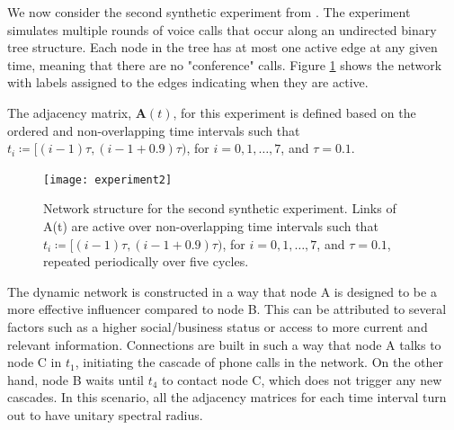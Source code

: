 

\newpage
{}


We now consider the second synthetic experiment from \cite{grindrod2014dynamical}. The experiment simulates multiple rounds of voice calls that occur along an undirected binary tree structure. Each node in the tree has at most one active edge at any given time, meaning that there are no "conference" calls.  Figure \ref{fig:exp2} shows the network with labels assigned to the edges indicating when they are active. 

The adjacency matrix, $\mathbf{A}(t)$, for this experiment is defined based on the ordered and non-overlapping time intervals such that $t_i\coloneqq[(i − 1)\tau , (i − 1 + 0.9)\tau )$, for $i=0, 1, \dots , 7$, and $\tau =0.1$.

\begin{figure}[h]\centering
    \texttt{[image: experiment2]}
    \caption{Network structure for the second synthetic experiment. Links of A(t)  are active over non-overlapping time intervals such that $t_i\coloneqq[(i − 1)\tau , (i − 1 + 0.9)\tau )$, for $i=0, 1, \dots , 7$, and $\tau =0.1$, repeated periodically over five cycles.}
    \label{fig:exp2}
    \bigskip
\end{figure}

The dynamic network is constructed in a way that node A is designed to be a more effective influencer compared to node B. This can be attributed to several factors such as a higher social/business status or access to more current and relevant information. Connections are built in such a way that node A talks to node C in $t_1$, initiating the cascade of phone calls in the network. On the other hand, node B waits until $t_4$ to contact node C, which does not trigger any new cascades. In this scenario, all the adjacency matrices for each time interval turn out to have unitary spectral radius.


